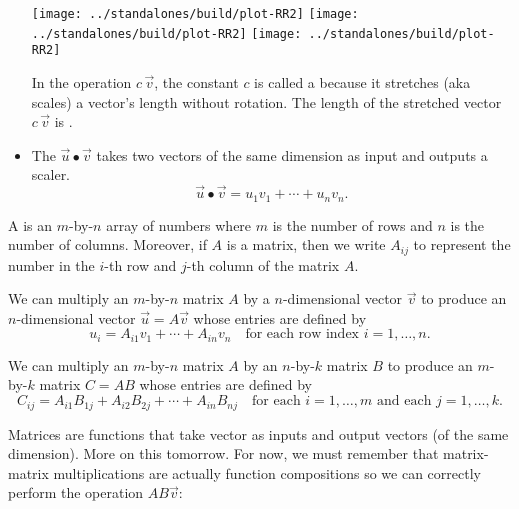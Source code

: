 \documentclass[../main.tex]{subfiles}
\begin{document}
\begin{itemize}[wide]
    \texttt{[image: ../standalones/build/plot-RR2]}
    \quad
    \texttt{[image: ../standalones/build/plot-RR2]}
    \quad
    \texttt{[image: ../standalones/build/plot-RR2]}

    \faStar{} In the operation \(c \, \vec{v}\), the constant \(c\) is called a  because it stretches (aka scales) a vector's length without rotation.  The length of the stretched vector \(c \, \vec{v}\) is \underline{\hspace{2in}\phantom{\huge X}}.

  \item The  \(\vec{u} \bullet \vec{v}\) takes two vectors of the same dimension as input and outputs a scaler. 
    \begin{equation}
      \vec{u} \bullet \vec{v} = u_{1} v_{1} + \cdots + u_{n} v_{n}.
    \end{equation}
    
\end{itemize}

A  is an \(m\)-by-\(n\) array of numbers where \(m\) is the number of rows and \(n\) is the number of columns.  Moreover, if \(A\) is a matrix, then we write \(A_{ij}\) to represent the number in the \(i\)-th row and \(j\)-th column of the matrix \(A\). 

We can multiply an \(m\)-by-\(n\) matrix \(A\) by a \(n\)-dimensional vector \(\vec{v}\) to produce an \(n\)-dimensional vector \(\vec{u} = A\vec{v}\) whose entries are defined by
\[
  u_{i} = A_{i1} v_{1} + \cdots + A_{in} v_{n} 
  \quad\text{for each row index \(i = 1, \ldots, n\)}.
\]


We can multiply an \(m\)-by-\(n\) matrix \(A\) by an \(n\)-by-\(k\) matrix \(B\) to produce an \(m\)-by-\(k\) matrix \(C = AB\) whose entries are defined by
\begin{equation}
  C_{ij} = 
  A_{i1} B_{1j} + A_{i2} B_{2j} + \cdots + A_{in} B_{nj}
  \quad\text{for each \(i = 1, \ldots, m\) and each \(j = 1, \ldots, k\)}.
\end{equation}

Matrices are functions that take vector as inputs and output vectors (of the same dimension). More on this tomorrow. For now, we must remember that matrix-matrix multiplications are actually function compositions so we can correctly perform the operation \(A B \vec{v}\):
\clearpage
\end{document}
